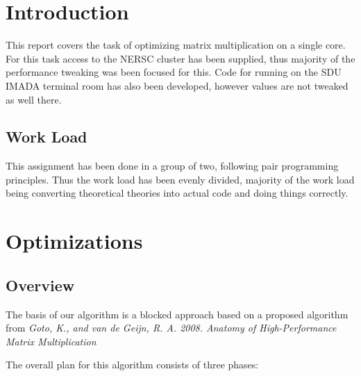 \documentclass[a4paper.11pt,oneside]{book}
\begin{document}
\renewcommand{\contentsname}{Table of Contents}
\tableofcontents
\thispagestyle{empty}

\pagestyle{ruled}
\chapter{Introduction}
\setcounter{section}{1}

This report covers the task of optimizing matrix multiplication on a single
core. For this task access to the NERSC cluster has been supplied, thus majority
of the performance tweaking was been focused for this. Code for running on the
SDU IMADA terminal room has also been developed, however values are not tweaked
as well there.

\section{Work Load}

This assignment has been done in a group of two, following pair programming
principles. Thus the work load has been evenly divided, majority of the work
load being converting theoretical theories into actual code and doing things
correctly.

\chapter{Optimizations}
\section{Overview}

The basis of our algorithm is a blocked approach based on a proposed algorithm
from \emph{Goto, K., and van de Geijn, R. A. 2008. Anatomy of High-Performance
Matrix Multiplication} 

The overall plan for this algorithm consists of three phases:
\end{document}
